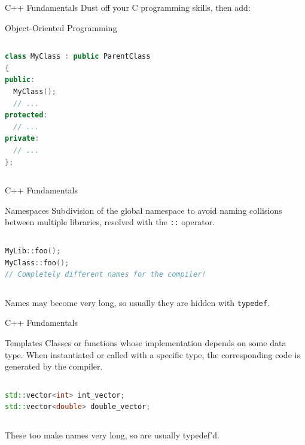 \begin{frame}[fragile]{C++ Fundamentals}
Dust off your C programming skills, then add:
\begin{block}{Object-Oriented Programming}
\begin{columns}
\begin{lstlisting}[language=C++, caption=Example definition of a C++ class]
class MyClass : public ParentClass
{
public:
  MyClass();
  // ...
protected:
  // ...
private:
  // ...
};
\end{lstlisting}
\end{columns}
\end{block}
\end{frame}
\begin{frame}[fragile]{C++ Fundamentals}
\begin{block}{Namespaces}
Subdivision of the global namespace to avoid naming collisions between multiple libraries, resolved with the \texttt{::} operator.

\begin{columns}
\begin{lstlisting}[language=C++, caption=Example of namespaces usage]
MyLib::foo();
MyClass::foo();
// Completely different names for the compiler!
\end{lstlisting}
\end{columns}

Names may become very long, so usually they are hidden with \texttt{typedef}.
\end{block}
\end{frame}
\begin{frame}[fragile]{C++ Fundamentals}
\begin{block}{Templates}
Classes or functions whose implementation depends on some data type. When instantiated or called with a specific type, the corresponding code is generated by the compiler.

\begin{columns}
\begin{lstlisting}[language=C++, caption=Example of objects of the template class \texttt{std::vector}]
std::vector<int> int_vector;
std::vector<double> double_vector;
\end{lstlisting}
\end{columns}

These too make names very long, so are usually typedef'd.
\end{block}
\end{frame}
